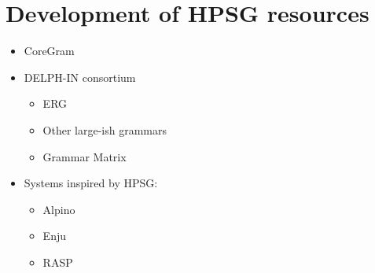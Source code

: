 \documentclass[output=paper]{langsci/langscibook}
\begin{document}
\section{Development of HPSG resources}


\begin{itemize}
 \item  CoreGram
 \item  DELPH-IN consortium
    \begin{itemize}
    \item ERG
    \item Other large-ish grammars
    \item Grammar Matrix
    \end{itemize}
 \item Systems inspired by HPSG:
   \begin{itemize}
     \item Alpino
     \item Enju
     \item RASP
   \end{itemize}
\end{itemize}






\end{document}

